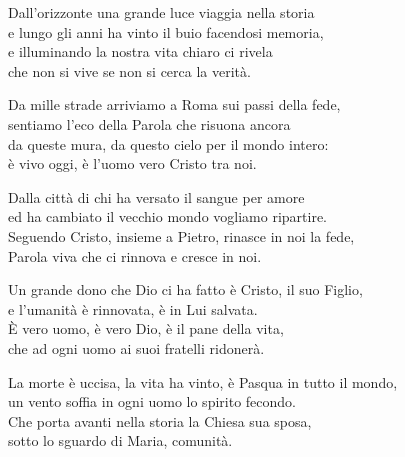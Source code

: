 
\strofa Dall'orizzonte una grande luce viaggia nella storia\\
e lungo gli anni ha vinto il buio facendosi memoria,\\
e illuminando la nostra vita chiaro ci rivela\\
che non si vive se non si cerca la verità.

\spazio

\strofa Da mille strade arriviamo a Roma sui passi della fede,\\
sentiamo l'eco della Parola che risuona ancora\\
da queste mura, da questo cielo per il mondo intero:\\
è vivo oggi, è l'uomo vero Cristo tra noi.

\spazio


\spazio

\strofa Dalla città di chi ha versato il sangue per amore\\
ed ha cambiato il vecchio mondo vogliamo ripartire.\\
Seguendo Cristo, insieme a Pietro, rinasce in noi la fede,\\
Parola viva che ci rinnova e cresce in noi.

\spazio


\spazio

\strofa Un grande dono che Dio ci ha fatto è Cristo, il suo Figlio,\\
e l'umanità è rinnovata, è in Lui salvata.\\
È vero uomo, è vero Dio, è il pane della vita,\\
che ad ogni uomo ai suoi fratelli ridonerà.

\spazio


\spazio

\strofa La morte è uccisa, la vita ha vinto, è Pasqua in tutto il mondo,\\
un vento soffia in ogni uomo lo spirito fecondo.\\
Che porta avanti nella storia la Chiesa sua sposa,\\
sotto lo sguardo di Maria, comunità.

